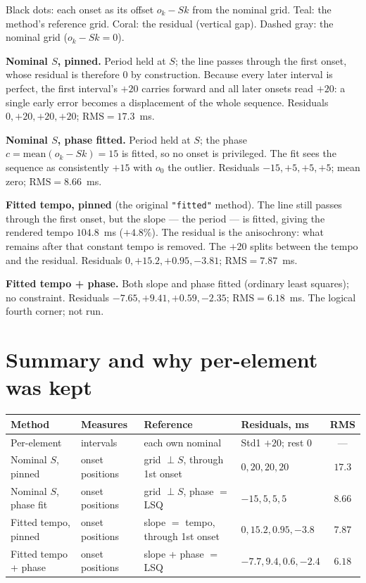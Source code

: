 \documentclass[11pt]{article}
\newcommand{\rms}{\mathrm{RMS}}
\begin{document}
\vspace{2pt}
{\footnotesize
Black dots: each onset as its offset $o_k - Sk$ from the nominal grid.
\textcolor{tealc}{Teal}: the method's reference grid. \textcolor{coralc}{Coral}:
the residual (vertical gap). Dashed gray: the nominal grid ($o_k - Sk = 0$).}

\vspace{6pt}

\textbf{Nominal $S$, pinned.} Period held at $S$; the line passes through the
first onset, whose residual is therefore $0$ by construction. Because every later
interval is perfect, the first interval's $+20$ carries forward and all later
onsets read $+20$: a single early error becomes a displacement of the whole
sequence. Residuals $0,+20,+20,+20$; $\rms = 17.3$~ms.

\textbf{Nominal $S$, phase fitted.} Period held at $S$; the phase
$c=\text{mean}(o_k-Sk)=15$ is fitted, so no onset is privileged. The fit sees the
sequence as consistently $+15$ with $o_0$ the outlier. Residuals
$-15,+5,+5,+5$; mean zero; $\rms = 8.66$~ms.

\textbf{Fitted tempo, pinned} (the original \texttt{"fitted"} method). The line
still passes through the first onset, but the slope --- the period --- is fitted,
giving the rendered tempo $104.8$~ms ($+4.8\%$). The residual is the anisochrony:
what remains after that constant tempo is removed. The $+20$ splits between the
tempo and the residual. Residuals $0,+15.2,+0.95,-3.81$; $\rms = 7.87$~ms.

\textbf{Fitted tempo + phase.} Both slope and phase fitted (ordinary least
squares); no constraint. Residuals $-7.65,+9.41,+0.59,-2.35$; $\rms = 6.18$~ms.
The logical fourth corner; not run.

\section*{Summary and why per-element was kept}

\begin{center}
\renewcommand{\arraystretch}{1.25}
\footnotesize
\begin{tabular}{@{}p{3.2cm} p{2.2cm} p{3.0cm} p{2.6cm} c@{}}
\toprule
\textbf{Method} & \textbf{Measures} & \textbf{Reference} &
\textbf{Residuals, ms} & \textbf{RMS} \\
\midrule
Per-element & intervals & each own nominal & Std1 $+20$; rest $0$ & --- \\
Nominal $S$, pinned & onset positions & grid $\perp S$, through 1st onset & $0,20,20,20$ & $17.3$ \\
Nominal $S$, phase fit & onset positions & grid $\perp S$, phase $=$ LSQ & $-15,5,5,5$ & $8.66$ \\
Fitted tempo, pinned & onset positions & slope $=$ tempo, through 1st onset & $0,15.2,0.95,-3.8$ & $7.87$ \\
Fitted tempo + phase & onset positions & slope + phase $=$ LSQ & $-7.7,9.4,0.6,-2.4$ & $6.18$ \\
\bottomrule
\end{tabular}
\end{center}
\end{document}
